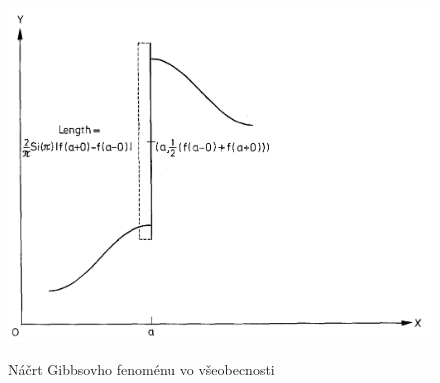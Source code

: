 \begin{figure}[htp]
    \centering
    \includegraphics{obrazky/transformacia/gibbs/gibbs_figura}
    \label{fig:gibbs_figura}
    \caption{Náčrt Gibbsovho fenoménu vo všeobecnosti}
\end{figure}
